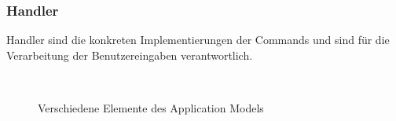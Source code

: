 \subsubsection{Handler}
Handler sind die konkreten Implementierungen der Commands und sind für die Verarbeitung der Benutzereingaben verantwortlich.

\begin{figure}

\hfill
{}\\
\hfill
{}

\caption{Verschiedene Elemente des Application Models}
\label{rcp_example}
\end{figure}


